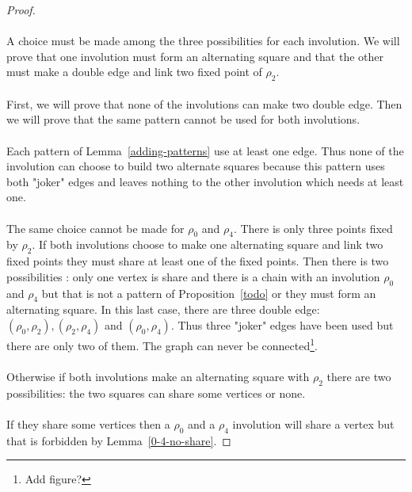 \begin{proof}
\paragraph{}
A choice must be made among the three possibilities for each involution. We will prove that one involution must form an alternating square and that the other must make a double edge and link two fixed point of $\rho_2$.

\paragraph{}
First, we will prove that none of the involutions can make two double edge. Then we will prove that the same pattern cannot be used for both involutions.

\paragraph{}
Each pattern of Lemma~\ref{adding-patterns} use at least one edge. Thus none of the involution can choose to build two alternate squares because this pattern uses both "joker" edges and leaves nothing to the other involution which needs at least one.

\paragraph{}
The same choice cannot be made for $\rho_0$ and $\rho_4$. There is only three points fixed by $\rho_2$. If both involutions choose to make one alternating square and link two fixed points they must share at least one of the fixed points. Then there is two possibilities : only one vertex is share and there is a chain with an involution $\rho_0$ and $\rho_4$ but that is not a pattern of Proposition~\ref{todo} or they must form an alternating square. In this last case, there are three double edge: $(\rho_0, \rho_2), (\rho_2, \rho_4)$ and $(\rho_0, \rho_4)$. Thus three "joker" edges have been used but there are only two of them. The graph can never be connected\footnote{Add figure?}.

\paragraph{}
Otherwise if both involutions make an alternating square with $\rho_2$ there are two possibilities: the two squares can share some vertices or none.


\paragraph{}
If they share some vertices then a $\rho_0$ and a $\rho_4$ involution will share a vertex but that is forbidden by Lemma~\ref{0-4-no-share}.


\end{proof}
